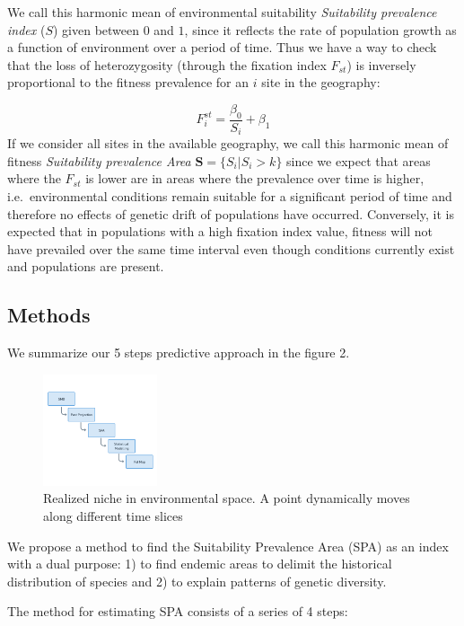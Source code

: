\documentclass[
]{article}
\begin{document}
We call this harmonic mean of environmental suitability
\emph{Suitability prevalence index }(\(S\)) given between \(0\) and
\(1\), since it reflects the rate of population growth as a function of
environment over a period of time. Thus we have a way to check that the
loss of heterozygosity (through the fixation index \(F_{st}\)) is
inversely proportional to the fitness prevalence for an \(i\) site in
the geography:

\[
F_{i}^{st}= \frac{\beta_0}{S_i} + \beta_1
\] If we consider all sites in the available geography, we call this
harmonic mean of fitness \emph{Suitability prevalence Area}
\(\mathbf{S} = \{S_i | S_i > k\}\) since we expect that areas where the
\(F_{st}\) is lower are in areas where the prevalence over time is
higher, i.e.~environmental conditions remain suitable for a significant
period of time and therefore no effects of genetic drift of populations
have occurred. Conversely, it is expected that in populations with a
high fixation index value, fitness will not have prevailed over the same
time interval even though conditions currently exist and populations are
present.

\hypertarget{methods}{%
\subsection{Methods}\label{methods}}

We summarize our 5 steps predictive approach in the figure 2.

\begin{figure}
\centering
\includegraphics[width=0.3\textwidth,height=\textheight]{all_figures/figure_2.png}
\caption{Realized niche in environmental space. A point dynamically
moves along different time slices}
\end{figure}

We propose a method to find the Suitability Prevalence Area (SPA) as an
index with a dual purpose: 1) to find endemic areas to delimit the
historical distribution of species and 2) to explain patterns of genetic
diversity.

The method for estimating SPA consists of a series of 4 steps:
\end{document}
